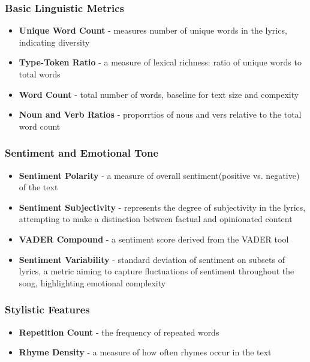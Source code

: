 \subsubsection*{Basic Linguistic Metrics}
\begin{itemize}
  \item \textbf{Unique Word Count} - measures number of unique words in the lyrics, indicating diversity
  \item \textbf{Type-Token Ratio} - a measure of lexical richness: ratio of unique words to total words
  \item \textbf{Word Count} - total  number of words, baseline for text size and compexity
  \item \textbf{Noun and Verb Ratios} - proporrtios of nous and vers relative to the total word count
\end{itemize}


\subsubsection*{Sentiment and Emotional Tone}
\begin{itemize}
  \item \textbf{Sentiment Polarity} - a measure of overall sentiment(positive
    vs. negative) of the text
  \item \textbf{Sentiment Subjectivity} - represents the degree of subjectivity
    in the lyrics, attempting to make a distinction between factual and
    opinionated content
  \item \textbf{VADER Compound} - a sentiment score derived from the VADER tool
  \item \textbf{Sentiment Variability} - standard deviation of sentiment on
    subsets of lyrics, a metric  aiming to capture fluctuations of sentiment
    throughout the song, highlighting emotional complexity
\end{itemize}


\subsubsection*{Stylistic Features}
\begin{itemize}
  \item \textbf{Repetition Count} - the frequency of repeated words
  \item \textbf{Rhyme Density} - a measure of how often rhymes occur in the
    text
\end{itemize}


